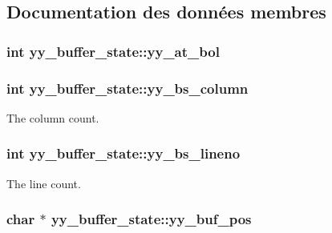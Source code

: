\subsection{Documentation des données membres}
\hypertarget{structyy__buffer__state_a9d60c60af6e1a6f69de16871fd64f85f}{}
\subsubsection[{yy\+\_\+at\+\_\+bol}]{\setlength{\rightskip}{0pt plus 5cm}int yy\+\_\+buffer\+\_\+state\+::yy\+\_\+at\+\_\+bol}\label{structyy__buffer__state_a9d60c60af6e1a6f69de16871fd64f85f}
\hypertarget{structyy__buffer__state_a10c4fcd8be759e6bf11e6d3e8cdb0307}{}
\subsubsection[{yy\+\_\+bs\+\_\+column}]{\setlength{\rightskip}{0pt plus 5cm}int yy\+\_\+buffer\+\_\+state\+::yy\+\_\+bs\+\_\+column}\label{structyy__buffer__state_a10c4fcd8be759e6bf11e6d3e8cdb0307}
The column count. \hypertarget{structyy__buffer__state_a818e94bc9c766e683c60df1e9fd01199}{}
\subsubsection[{yy\+\_\+bs\+\_\+lineno}]{\setlength{\rightskip}{0pt plus 5cm}int yy\+\_\+buffer\+\_\+state\+::yy\+\_\+bs\+\_\+lineno}\label{structyy__buffer__state_a818e94bc9c766e683c60df1e9fd01199}
The line count. \hypertarget{structyy__buffer__state_a8435c3f786bbb55d21d0174e4cfc22a0}{}
\subsubsection[{yy\+\_\+buf\+\_\+pos}]{\setlength{\rightskip}{0pt plus 5cm}char $\ast$ yy\+\_\+buffer\+\_\+state\+::yy\+\_\+buf\+\_\+pos}\label{structyy__buffer__state_a8435c3f786bbb55d21d0174e4cfc22a0}
\hypertarget{structyy__buffer__state_a48302f5f3477a9c78bbddf56d356ef54}{}
